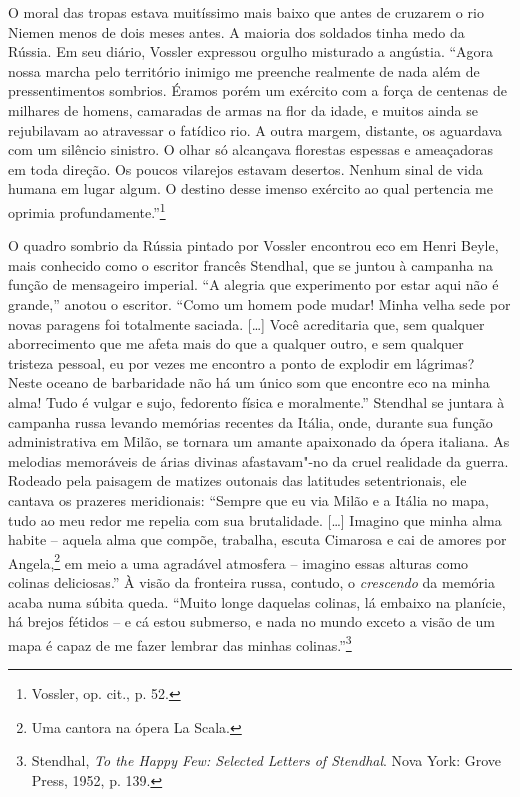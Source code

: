 O moral das tropas estava muitíssimo mais baixo que antes de cruzarem o
rio Niemen menos de dois meses antes. A maioria dos soldados tinha medo
da Rússia. Em seu diário, Vossler expressou orgulho misturado a
angústia. ``Agora nossa marcha pelo território inimigo me preenche
realmente de nada além de pressentimentos sombrios. Éramos porém um
exército com a força de centenas de milhares de homens, camaradas de
armas na flor da idade, e muitos ainda se rejubilavam ao atravessar o
fatídico rio. A outra margem, distante, os aguardava com um silêncio
sinistro. O olhar só alcançava florestas espessas e ameaçadoras em toda
direção. Os poucos vilarejos estavam desertos. Nenhum sinal de vida
humana em lugar algum. O destino desse imenso exército ao qual pertencia
me oprimia profundamente.''\footnote{Vossler, op. cit., p. 52.}

O quadro sombrio da Rússia pintado por Vossler encontrou eco em Henri
Beyle, mais conhecido como o escritor francês Stendhal, que se juntou à
campanha na função de mensageiro imperial. ``A alegria que experimento
por estar aqui não é grande,'' anotou o escritor. ``Como um homem pode
mudar! Minha velha sede por novas paragens foi totalmente saciada.
[\ldots{}] Você acreditaria que, sem qualquer aborrecimento que me afeta
mais do que a qualquer outro, e sem qualquer tristeza pessoal, eu por
vezes me encontro a ponto de explodir em lágrimas? Neste oceano de
barbaridade não há um único som que encontre eco na minha alma! Tudo é
vulgar e sujo, fedorento física e moralmente.'' Stendhal se juntara à
campanha russa levando memórias recentes da Itália, onde, durante sua
função administrativa em Milão, se tornara um amante apaixonado da ópera
italiana. As melodias memoráveis de árias divinas afastavam"-no da cruel
realidade da guerra. Rodeado pela paisagem de matizes outonais das
latitudes setentrionais, ele cantava os prazeres meridionais: ``Sempre
que eu via Milão e a Itália no mapa, tudo ao meu redor me repelia
com sua brutalidade. [\ldots{}] Imagino que minha alma habite -- aquela
alma que compõe, trabalha, escuta Cimarosa e cai de amores por Angela,\footnote{Uma cantora na ópera La Scala.} em meio a uma agradável atmosfera --
imagino essas alturas como colinas deliciosas.'' À visão da fronteira
russa, contudo, o \textit{crescendo} da memória acaba numa súbita queda.
``Muito longe daquelas colinas, lá embaixo na planície, há brejos
fétidos -- e cá estou submerso, e nada no mundo exceto a visão de um mapa
é capaz de me fazer lembrar das minhas colinas.''\footnote{Stendhal, \textit{To the Happy Few: Selected Letters of Stendhal}. Nova York: Grove Press, 1952, p. 139.}

